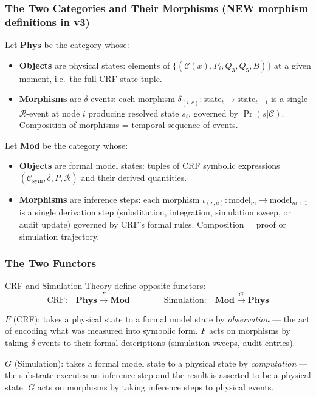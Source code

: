 \documentclass[12pt, a4paper]{article}
\begin{document}
\subsubsection{The Two Categories and Their Morphisms (NEW morphism
definitions in v3)}

Let $\mathbf{Phys}$ be the category whose:
\begin{itemize}[leftmargin=*,noitemsep]
\item \textbf{Objects} are physical states: elements of
  $\{(\mathcal{C}(x), P_i, Q_3, Q_5, B)\}$ at a given moment,
  i.e.\ the full CRF state tuple.
\item \textbf{Morphisms} are $\delta$-events: each morphism
  $\delta_{(i,c)}: \text{state}_t \to \text{state}_{t+1}$ is
  a single $\mathcal{R}$-event at node $i$ producing resolved
  state $s_i$, governed by $\Pr(s|\mathcal{C})$.
  Composition of morphisms = temporal sequence of events.
\end{itemize}

Let $\mathbf{Mod}$ be the category whose:
\begin{itemize}[leftmargin=*,noitemsep]
\item \textbf{Objects} are formal model states: tuples of CRF
  symbolic expressions $(\mathcal{C}_{\mathrm{sym}}, \delta, P, \mathcal{R})$
  and their derived quantities.
\item \textbf{Morphisms} are inference steps: each morphism
  $\iota_{(r,a)}: \text{model}_m \to \text{model}_{m+1}$ is a
  single derivation step (substitution, integration, simulation
  sweep, or audit update) governed by CRF's formal rules.
  Composition = proof or simulation trajectory.
\end{itemize}

\subsubsection{The Two Functors}

CRF and Simulation Theory define opposite functors:
\[
\text{CRF:} \quad
\mathbf{Phys} \xrightarrow{\;F\;} \mathbf{Mod}
\qquad\qquad
\text{Simulation:} \quad
\mathbf{Mod} \xrightarrow{\;G\;} \mathbf{Phys}
\]

$F$ (CRF): takes a physical state to a formal model state by
\emph{observation} --- the act of encoding what was measured into
symbolic form. $F$ acts on morphisms by taking $\delta$-events to
their formal descriptions (simulation sweeps, audit entries).

$G$ (Simulation): takes a formal model state to a physical state
by \emph{computation} --- the substrate executes an inference step
and the result is asserted to be a physical state. $G$ acts on
morphisms by taking inference steps to physical events.
\end{document}
